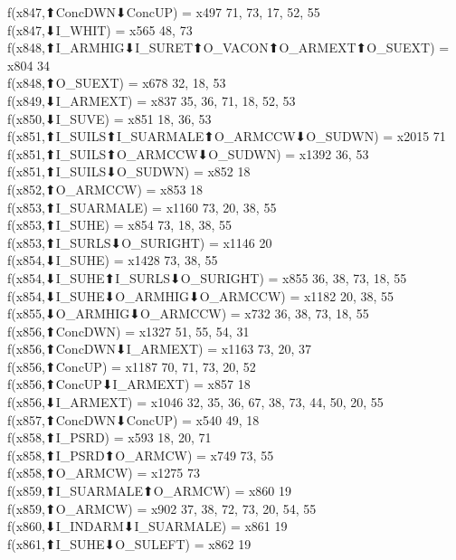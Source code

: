 f(x847,⬆ConcDWN⬇ConcUP) = x497 {71, 73, 17, 52, 55} \\
f(x847,⬇I_WHIT) = x565 {48, 73} \\
f(x848,⬆I_ARMHIG⬇I_SURET⬆O_VACON⬆O_ARMEXT⬆O_SUEXT) = x804 {34} \\
f(x848,⬆O_SUEXT) = x678 {32, 18, 53} \\
f(x849,⬇I_ARMEXT) = x837 {35, 36, 71, 18, 52, 53} \\
f(x850,⬇I_SUVE) = x851 {18, 36, 53} \\
f(x851,⬆I_SUILS⬆I_SUARMALE⬆O_ARMCCW⬇O_SUDWN) = x2015 {71} \\
f(x851,⬆I_SUILS⬆O_ARMCCW⬇O_SUDWN) = x1392 {36, 53} \\
f(x851,⬆I_SUILS⬇O_SUDWN) = x852 {18} \\
f(x852,⬆O_ARMCCW) = x853 {18} \\
f(x853,⬆I_SUARMALE) = x1160 {73, 20, 38, 55} \\
f(x853,⬆I_SUHE) = x854 {73, 18, 38, 55} \\
f(x853,⬆I_SURLS⬇O_SURIGHT) = x1146 {20} \\
f(x854,⬇I_SUHE) = x1428 {73, 38, 55} \\
f(x854,⬇I_SUHE⬆I_SURLS⬇O_SURIGHT) = x855 {36, 38, 73, 18, 55} \\
f(x854,⬇I_SUHE⬇O_ARMHIG⬇O_ARMCCW) = x1182 {20, 38, 55} \\
f(x855,⬇O_ARMHIG⬇O_ARMCCW) = x732 {36, 38, 73, 18, 55} \\
f(x856,⬆ConcDWN) = x1327 {51, 55, 54, 31} \\
f(x856,⬆ConcDWN⬇I_ARMEXT) = x1163 {73, 20, 37} \\
f(x856,⬆ConcUP) = x1187 {70, 71, 73, 20, 52} \\
f(x856,⬆ConcUP⬇I_ARMEXT) = x857 {18} \\
f(x856,⬇I_ARMEXT) = x1046 {32, 35, 36, 67, 38, 73, 44, 50, 20, 55} \\
f(x857,⬆ConcDWN⬇ConcUP) = x540 {49, 18} \\
f(x858,⬆I_PSRD) = x593 {18, 20, 71} \\
f(x858,⬆I_PSRD⬆O_ARMCW) = x749 {73, 55} \\
f(x858,⬆O_ARMCW) = x1275 {73} \\
f(x859,⬆I_SUARMALE⬆O_ARMCW) = x860 {19} \\
f(x859,⬆O_ARMCW) = x902 {37, 38, 72, 73, 20, 54, 55} \\
f(x860,⬇I_INDARM⬇I_SUARMALE) = x861 {19} \\
f(x861,⬆I_SUHE⬇O_SULEFT) = x862 {19} \\
